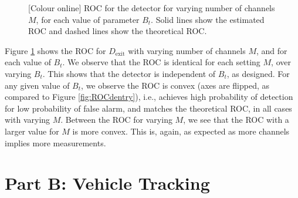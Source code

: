 \documentclass[11pt]{article}
\begin{document}
\begin{figure}[h!]
\caption{[Colour online] ROC for the detector for varying number of channels $M$, for each value of parameter $B_{t}$. Solid lines show the estimated ROC and dashed lines show the theoretical ROC.}
\label{fig:ROCdexit}
\end{figure}

Figure \ref{fig:ROCdexit} shows the ROC for $D_{\text{exit}}$ with varying number of channels $M$, and for each value of $B_{t}$. We observe that the ROC is identical for each setting $M$, over varying $B_{t}$. This shows that the detector is independent of $B_{t}$, as designed. For any given value of $B_{t}$, we observe the ROC is convex (axes are flipped, as compared to Figure \ref{fig:ROCdentry}), i.e., achieves high probability of detection for low probability of false alarm, and matches the theoretical ROC, in all cases with varying $M$. Between the ROC for varying $M$, we see that the ROC with a larger value for $M$ is more convex. This is, again, as expected as more channels implies more measurements.

 
\section{Part B: Vehicle Tracking}
\label{sec:partA_Tracking}
\end{document}
